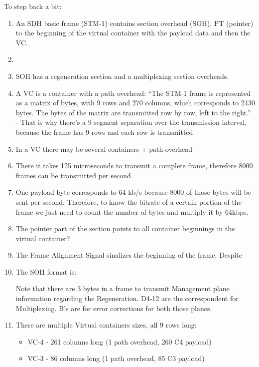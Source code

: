 To step back a bit:
\begin{enumerate}
    \item An SDH basic frame (STM-1) contains section overhead (SOH), PT (pointer) to the beginning of the virtual container with the payload data and then the VC. 
    \item {}
    \item SOH has a regeneration section and a multiplexing section overheads.
    \item A VC is a container with a path overhead:
    ``The STM-1 frame is 
    represented as a matrix of
    bytes, with 9 rows and 270
    columns, which corresponds
    to 2430 bytes.
    The bytes of the matrix are
    transmitted row by row, left to
    the right.'' - That is why there's a 9 segment separation over the transmission interval, because the frame has 9 rows and each row is transmitted 

    \item In a VC there may be several containers + path-overhead
    \item There it takes 125 microseconds to transmit a complete frame, therefore 8000 frames can be transmitted per second.
    \item One payload byte corresponds to 64 kb/s because 8000 of those bytes will be 
    sent per second. Therefore, to know the bitrate of a certain portion of the frame we just need to count the number of bytes and multiply it by 64kbps.
    \item The pointer part of the section points to all container beginnings in the virtual container?
    \item The Frame Alignment Signal sinalizes the beginning of the frame. Despite 
    \item The SOH format is:

    Note that there are 3 bytes in a frame to transmit Management plane information regarding the Regeneration. D4-12 are the correspondent for Multiplexing.
    B's are for error corrections for both those planes.
    
    \item There are multiple Virtual containers sizes, all 9 rows long:
        \begin{itemize}
            \item VC-4 - 261 columns long (1 path overhead, 260 C4 payload)
            \item VC-3 - 86 columns long (1 path overhead, 85 C3 payload)
        \end{itemize}


\end{enumerate}
